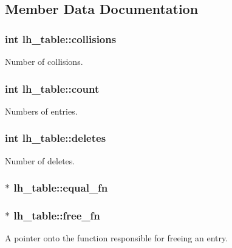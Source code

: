 \subsection{Member Data Documentation}
\subsubsection[{\texorpdfstring{collisions}{collisions}}]{\setlength{\rightskip}{0pt plus 5cm}int lh\+\_\+table\+::collisions}\hypertarget{structlh__table_a9458e41d842ce40cd37dc13458ced133}{}\label{structlh__table_a9458e41d842ce40cd37dc13458ced133}
Number of collisions. 
\subsubsection[{\texorpdfstring{count}{count}}]{\setlength{\rightskip}{0pt plus 5cm}int lh\+\_\+table\+::count}\hypertarget{structlh__table_aa172ed8fe205367b54e0e2cdf9ea8c6c}{}\label{structlh__table_aa172ed8fe205367b54e0e2cdf9ea8c6c}
Numbers of entries. 
\subsubsection[{\texorpdfstring{deletes}{deletes}}]{\setlength{\rightskip}{0pt plus 5cm}int lh\+\_\+table\+::deletes}\hypertarget{structlh__table_a8348bdd7e61c8d72b402f6a152013fbf}{}\label{structlh__table_a8348bdd7e61c8d72b402f6a152013fbf}
Number of deletes. 
\subsubsection[{\texorpdfstring{equal\+\_\+fn}{equal_fn}}]{$\ast$ lh\+\_\+table\+::equal\+\_\+fn}\hypertarget{structlh__table_aa646c287a6a46e09da6c7457c981a359}{}\label{structlh__table_aa646c287a6a46e09da6c7457c981a359}
\subsubsection[{\texorpdfstring{free\+\_\+fn}{free_fn}}]{$\ast$ lh\+\_\+table\+::free\+\_\+fn}\hypertarget{structlh__table_a30ea5903f4f8126abd6aa489ffe14737}{}\label{structlh__table_a30ea5903f4f8126abd6aa489ffe14737}
A pointer onto the function responsible for freeing an entry. 
